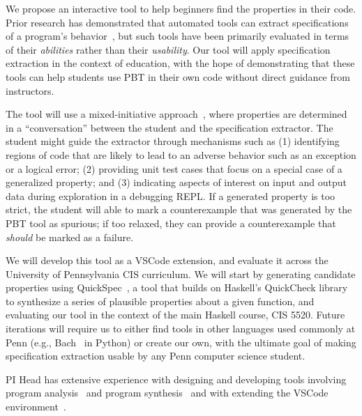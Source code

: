 We propose an interactive tool to help beginners find the properties in their
code. Prior research has demonstrated that automated tools can extract
specifications of a program's behavior~\cite{ref:ammons2002mining,
ref:le2018deep, ref:claessen2010quickspec}, but such tools have been primarily
evaluated in terms of their {\em abilities} rather than their {\em usability}.
Our tool will apply specification extraction in the context of education,
with the hope of demonstrating that these tools can help students use PBT in
their own code without direct guidance from instructors.

The tool will use a mixed-initiative approach~\cite{ref:allen1999mixed}, where
properties are determined in a ``conversation'' between the student and the
specification extractor.  The student might guide the extractor through
mechanisms such as (1) identifying regions of code that are likely to lead to an
adverse behavior such as an exception or a logical error; (2) providing unit
test cases that focus on a special case of a generalized property; and (3)
indicating aspects of interest on input and output data during exploration in a
debugging REPL.  If a generated property is too strict, the student will able to
mark a counterexample that was generated by the PBT tool as spurious; if too
relaxed, they can provide a counterexample that {\em should} be
marked as a failure.

We will develop this tool as a VSCode extension, and evaluate it across the
University of Pennsylvania CIS curriculum.  We will start by generating
candidate properties using QuickSpec~\cite{ref:claessen2010quickspec}, a tool
that builds on Haskell's QuickCheck library to synthesize a series of plausible
properties about a given function, and evaluating our tool in the context of the
main Haskell course, CIS 5520.
Future iterations will require us to either find tools in other languages used
commonly at Penn (e.g., Bach~\cite{smith_discovering_2017} in Python) or create
our own, with the ultimate goal of making specification extraction usable by any Penn
computer science student.

PI Head has extensive experience with designing and developing tools involving
program analysis~\cite{ref:head2018interactive,ref:head2019managing} and program
synthesis~\cite{ref:head2017writing} and with extending the VSCode
environment~\cite{ref:head2020composing}.

\immediate\closeout\workplanfile
{}

